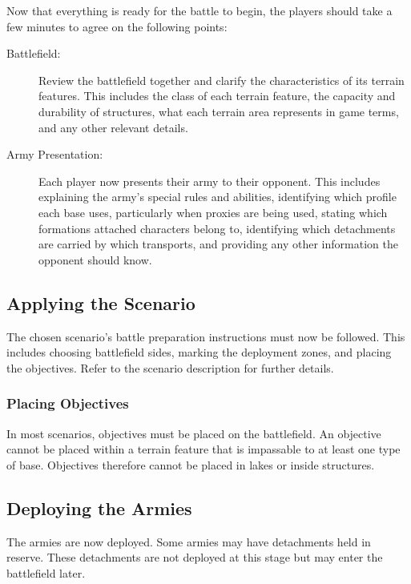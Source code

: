 Now that everything is ready for the battle to begin, the players should take a few minutes to agree on the following points:

\begin{description}
    \item[Battlefield:] Review the battlefield together and clarify the characteristics of its terrain features. This includes the class of each terrain feature, the capacity and durability of structures, what each terrain area represents in game terms, and any other relevant details.

    \item[Army Presentation:] Each player now presents their army to their opponent. This includes explaining the army's special rules and abilities, identifying which profile each base uses, particularly when proxies are being used, stating which formations attached characters belong to, identifying which detachments are carried by which transports, and providing any other information the opponent should know.
\end{description}

\subsection{Applying the Scenario}

The chosen scenario's battle preparation instructions must now be followed. This includes choosing battlefield sides, marking the deployment zones, and placing the objectives. Refer to the scenario description for further details.

\subsubsection{Placing Objectives}

In most scenarios, objectives must be placed on the battlefield. An objective cannot be placed within a terrain feature that is impassable to at least one type of base. Objectives therefore cannot be placed in lakes or inside structures.

\subsection{Deploying the Armies}

The armies are now deployed. Some armies may have detachments held in reserve. These detachments are not deployed at this stage but may enter the battlefield later.

